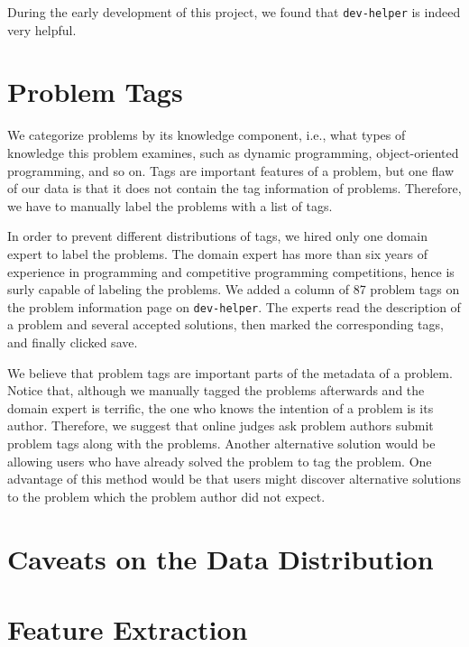     During the early development of this project, we found that \texttt{dev-helper} is indeed very helpful.

\section{Problem Tags}

    We categorize problems by its knowledge component, i.e., what types of knowledge this problem examines,
    such as dynamic programming, object-oriented programming, and so on.
    Tags are important features of a problem,
    but one flaw of our data is that it does not contain the tag information of problems.
    Therefore, we have to manually label the problems with a list of tags.

    In order to prevent different distributions of tags, we hired only one domain expert to label the problems.
    The domain expert has more than six years of experience in programming and competitive programming competitions,
    hence is surly capable of labeling the problems.
    We added a column of 87 problem tags on the problem information page on \texttt{dev-helper}.
    The experts read the description of a problem and several accepted solutions,
    then marked the corresponding tags, and finally clicked save.

    We believe that problem tags are important parts of the metadata of a problem.
    Notice that, although we manually tagged the problems afterwards and the domain expert is terrific,
    the one who knows the intention of a problem is its author.
    Therefore, we suggest that online judges ask problem authors submit problem tags along with the problems.
    Another alternative solution would be allowing users who have already solved the problem to tag the problem.
    One advantage of this method would be that users might discover alternative solutions to the problem
    which the problem author did not expect.

\section{Caveats on the Data Distribution}

\section{Feature Extraction}













